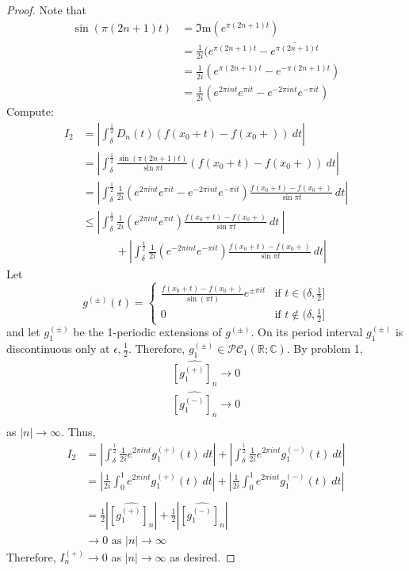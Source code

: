 \documentclass[12pt, reqno]{amsart}
\theoremstyle{definition}
\theoremstyle{remark}
\begin{document}
\begin{itemize}
\begin{itemize}
\begin{proof}
Note that 
\begin{align*}\sin(\pi(2n+1)t)&= \Im \text{m}(e^{\pi(2n+1)t})\\
&= \frac{1}{2i}(e^{\pi(2n+1)t}-\overline{e^{\pi(2n+1)t}}\\
&= \frac{1}{2i}(e^{\pi(2n+1)t}-e^{-\pi(2n+1)t})\\
&= \frac{1}{2i}(e^{2\pi int}e^{\pi it}-e^{-2\pi int}e^{-\pi it})\end{align*}
Compute:
\begin{align*}
I_{2}&= \left|\int_{\delta}^{\frac{1}{2}}D_{n}(t)(f(x_{0}+t)-f(x_{0}+))\ dt\right|\\
&= \left|\int_{\delta}^{\frac{1}{2}} \frac{\sin(\pi(2n+1)t)}{\sin \pi t}(f(x_{0}+t)-f(x_{0}+))\ dt\right|\\
&= \left|\int_{\delta}^{\frac{1}{2}} \frac{1}{2i}(e^{2\pi int}e^{\pi it}-e^{-2\pi int}e^{-\pi it}) \frac{f(x_{0}+t)-f(x_{0}+)}{\sin \pi t}\ dt\right|\\
&\le \left|\int_{\delta}^{\frac{1}{2}} \frac{1}{2i}(e^{2\pi int}e^{\pi it}) \frac{f(x_{0}+t)-f(x_{0}+)}{\sin \pi t}\ dt\ \right|\\
&\quad\quad\quad +\left|\int_{\delta}^{\frac{1}{2}} \frac{1}{2i}(e^{-2\pi int}e^{-\pi it}) \frac{f(x_{0}+t)-f(x_{0}+)}{\sin \pi t}\ dt\right|
\end{align*}
Let 
$$g^{(\pm)}(t)=\begin{cases} \frac{f(x_{0}+t)-f(x_{0}+)}{\sin(\pi t)}e^{\pm \pi it} & \text{if } t\in (\delta,\frac{1}{2}] \\
0 & \text{if }t\notin(\delta, \frac{1}{2}]\end{cases}$$and let $g^{(\pm)}_{1}$ be the 1-periodic extensions of $g^{(\pm)}$. On its period interval $g_{1}^{(\pm)}$ is discontinuous only at $\epsilon, \frac{1}{2}$. Therefore, $g_{1}^{(\pm)}\in\mathcal{PC}_{1}(\mathbb{R};\mathbb{C})$. By problem 1, \begin{align*}
\widehat{ [g^{(+)}_{1}]_{n}}\rightarrow 0\\
\widehat{ [g^{(-)}_{1}]_{n}}\rightarrow 0\\
\end{align*}as $|n|\rightarrow \infty$. Thus, \begin{align*}
I_{2}&= \left|\int_{\delta}^{\frac{1}{2}} \frac{1}{2i}e^{2\pi int} g_{1}^{(+)}(t)\ dt\right|+ \left|\int_{\delta}^{\frac{1}{2}} \frac{1}{2i}e^{2\pi int} g_{1}^{(-)}(t)\ dt\right|\\
&= \left| \frac{1}{2i}\int_{0}^{1} e^{2\pi int} g_{1}^{(+)}(t)\ dt\right|+ \left| \frac{1}{2i}\int_{0}^{1} e^{2\pi int} g_{1}^{(-)}(t)\ dt\right|\\\\
&= \frac{1}{2}\left|\widehat{[g_{1}^{(+)}]_{n}}\right|+ \frac{1}{2}\left|\widehat{[g_{1}^{(-)}]_{n}}\right|\\
& \rightarrow 0 \text{ as }|n| \rightarrow \infty
\end{align*}
Therefore, $I_{n}^{(+)}\rightarrow 0$ as $|n|\rightarrow \infty$ as desired.

\end{proof}


\end{itemize}
\end{itemize}
\end{document}

